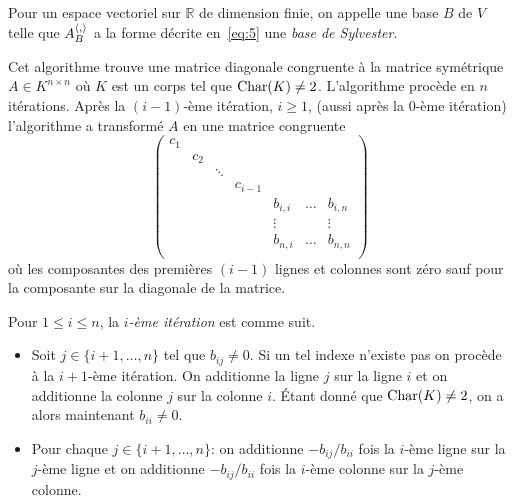\begin{definition}
  \label{def:37}
  Pour un espace vectoriel sur $ℝ$ de dimension finie, on appelle une base $B$ de $V$ telle que $A_B^{\langle {,} \rangle}$ a la forme décrite en~\eqref{eq:5} une \emph{base de Sylvester}. 
\end{definition}



\begin{algorithm}
  \label{alg:1}
  Cet algorithme trouve une matrice diagonale congruente à la matrice symétrique $A \in K^{n \times n}$ où $K$ est un corps tel que $\mathrm{Char}(K) \neq 2$.  L'algorithme procède en $n$ itérations. Après la $(i-1)$-ème itération, $i \geq 1$, (aussi après  la $0$-ème itération) l'algorithme a transformé $A$ en une matrice congruente 
  \begin{equation}
    \label{eq:7}
    \begin{pmatrix}
      c_1 \\
      & c_2 \\
      & & \ddots & &&\\
      & & & c_{i-1} \\
      & & & &  b_{i,i} & \dots & b_{i,n} \\
      & & & &     \vdots       &  & \vdots \\
      & & & &  b_{n,i} & \dots & b_{n,n} \\      
    \end{pmatrix}
  \end{equation}
où les composantes des premières $(i-1)$ lignes et colonnes sont zéro sauf pour la composante sur la diagonale de la matrice. 

\medskip 
\noindent 
Pour $1 \leq i \leq n$, la \emph{$i$-ème itération}  est comme suit. 
\begin{itemize}
\item Soit $j \in \{i+1,\dots,n\}$ tel que $b_{ij} \neq 0$. 
  Si un tel indexe n'existe pas on procède à la $i+1$-ème itération. 
  On additionne la ligne $j$ sur la ligne $i$ et on additionne la colonne $j$ sur la colonne $i$. Étant donné que $\mathrm{Char}(K) \neq 2$, on a alors maintenant $b_{ii} \neq 0$. 
\item Pour chaque $j \in \{i+1,\dots,n\}$:  on additionne $-b_{ij}/b_{ii}$ fois la $i$-ème ligne sur la $j$-ème ligne et on additionne $-b_{ij}/b_{ii}$ fois la $i$-ème colonne sur la $j$-ème colonne. 
\end{itemize}


\end{algorithm}




